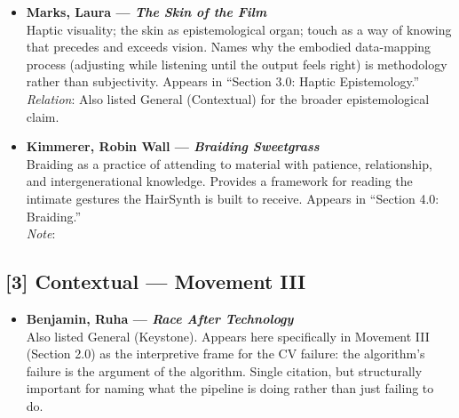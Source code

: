 \begin{itemize}

    \item \textbf{Marks, Laura — \textit{The Skin of the Film}} \parencite{Marks_2000}\\
    Haptic visuality; the skin as epistemological organ; touch as a way of knowing that precedes and exceeds vision. Names why the embodied data-mapping process (adjusting while listening until the output feels right) is methodology rather than subjectivity. Appears in ``Section 3.0: Haptic Epistemology.''\\
    \textit{Relation}: Also listed General (Contextual) for the broader epistemological claim.

    \item \textbf{Kimmerer, Robin Wall — \textit{Braiding Sweetgrass}} \parencite{Kimmerer_2013}\\
    Braiding as a practice of attending to material with patience, relationship, and intergenerational knowledge. Provides a framework for reading the intimate gestures the HairSynth is built to receive. Appears in ``Section 4.0: Braiding.''\\
    \textit{Note}: 

\end{itemize}

\subsection*{[3] Contextual — Movement III}

\begin{itemize}

    \item \textbf{Benjamin, Ruha — \textit{Race After Technology}} \parencite{Benjamin_2019a}\\
    Also listed General (Keystone). Appears here specifically in Movement III (Section 2.0) as the interpretive frame for the CV failure: the algorithm's failure is the argument of the algorithm. Single citation, but structurally important for naming what the pipeline is doing rather than just failing to do.

\end{itemize}

\bigskip


